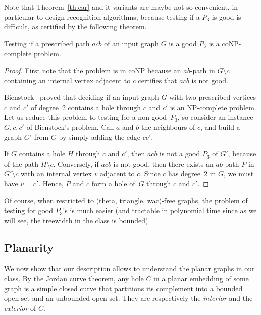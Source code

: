 \documentclass[11pt]{article}
\newcommand{\sm}{\setminus}
\begin{document}
Note that Theorem~\ref{th:ear} and it variants are maybe not so convenient, in particular to design recognition algorithms, because testing if a $P_3$ is good is difficult, as certified by the following theorem. 

\begin{theo}
  \label{th:goodNPC}
  Testing if a prescribed path $acb$ of an input graph $G$ is a good $P_3$ is a coNP-complete problem.  
\end{theo}

\begin{proof}
  First note that the problem is in coNP because an $ab$-path in $G\sm c$ containing an internal vertex adjacent to $c$ certifies that $acb$ is not good. 
  
  Bienstock~\cite{bienstock:evenpair} proved that deciding if an input graph $G$ with two prescribed vertices $c$ and $c'$ of degree~2 contains a hole through $c$ and $c'$ is an NP-complete problem.  
  Let us reduce this problem to testing for a non-good~$P_3$, so consider an instance $G, c, c'$ of Bienstock's problem.  Call $a$ and $b$ the neighbours of $c$, and build a graph $G'$ from $G$ by simply adding the edge $cc'$. 
  
  If $G$ contains a hole $H$ through $c$ and $c'$, then $acb$ is not a good $P_3$ of $G'$, because of the path $H\sm c$. Conversely, if $acb$ is not good, then there exists an $ab$-path $P$ in $G'\sm c$ with an internal vertex $v$ adjacent to $c$. Since $c$ has degree~2 in $G$, we must have $v=c'$.  Hence, $P$ and $c$ form a hole of~$G$ through $c$ and $c'$.     
\end{proof}

Of course, when restricted to (theta, triangle, wac)-free graphs, the problem of testing for good $P_3$'s is much easier (and tractable in polynomial time since as we will see, the treewidth in the class is bounded). 


\subsection{Planarity}
\label{ssec:planar}

We now show that our description allows to understand the planar graphs in our class. By the Jordan curve theorem, any hole $C$ in a planar embedding of some graph is a simple closed curve that partitions its complement into a bounded open set and an unbounded open set.  They are respectively the \emph{interior} and the \emph{exterior} of $C$.  
  
\end{document}
